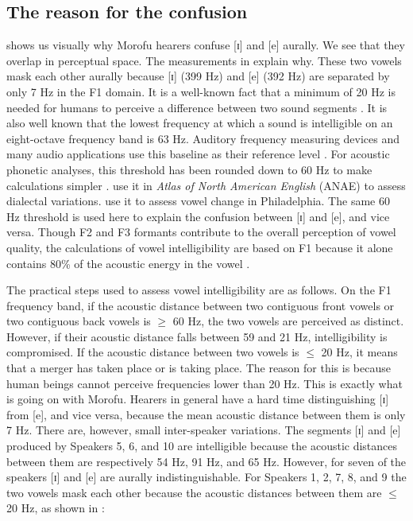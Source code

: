 \documentclass[output=paper,
modfonts
]{langscibook}
\begin{document}
\subsection{The reason for the confusion}
 shows us visually why  Morofu hearers confuse [ɪ] and [e] aurally. We see that they overlap in perceptual space. The measurements in  explain why. These two vowels mask each other aurally because [ɪ] (399 Hz) and [e] (392 Hz) are separated by only 7 Hz in the F1 domain. It is a well-known fact that a minimum of 20 Hz is needed for humans to perceive a difference between two sound segments \citep[34]{Ferrand2007}. It is also well known that the lowest frequency at which a sound is intelligible on an eight-octave frequency band is 63 Hz. Auditory frequency measuring devices and many audio applications use this baseline as their reference level \citep[12--16]{EverestPohlmann2015}. For acoustic phonetic analyses, this threshold has been rounded down to 60 Hz to make calculations simpler \citep[68]{Fry1979}. \citet[204--221]{LabovEtAl2006} use it in  \textit{Atlas of North American English}  (ANAE) to assess dialectal variations. \citet[43]{LabovEtAl2013} use it to assess vowel change in Philadelphia. The same 60 Hz threshold is used here to explain the confusion between [ɪ] and [e], and vice versa. Though F2 and F3 formants contribute to the overall perception of vowel quality, the calculations of vowel intelligibility are based on F1 because it alone contains 80\% of the acoustic energy in the vowel \citep[207]{LadefogedJohnson2015}. 

{The practical steps used to assess vowel intelligibility are as follows. On the F1 frequency band, if the acoustic distance between two contiguous front vowels or two contiguous back vowels is ${\geq}$ 60 Hz, the two vowels are perceived as distinct. However, if their acoustic distance falls between 59 and 21 Hz, intelligibility is compromised. If the acoustic distance between two vowels is ${\leq}$ 20 Hz, it means that a merger has taken place or is taking place. The reason for this is because human beings cannot perceive frequencies lower than 20 Hz. This is exactly what is going on with  Morofu. Hearers in general have a hard time distinguishing [ɪ] from [e], and vice versa, because the mean acoustic distance between them is only 7 Hz. There are, however, small inter-speaker variations. The segments [ɪ] and [e] produced by Speakers 5, 6, and 10 are intelligible because the acoustic distances between them are respectively 54 Hz, 91 Hz, and 65 Hz. However, for seven of the speakers [ɪ] and [e] are aurally indistinguishable. For Speakers 1, 2, 7, 8, and 9 the two vowels mask each other because the acoustic distances between them are ${\leq}$ 20 Hz, as shown in :}
\end{document}
